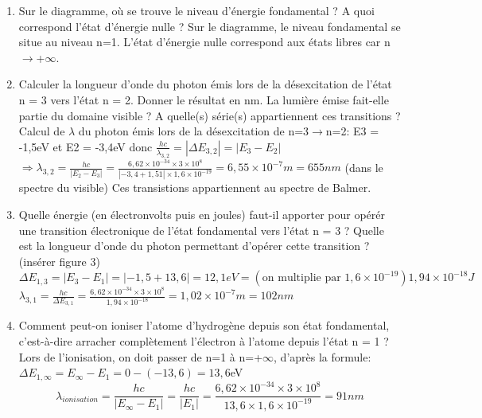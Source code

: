 \documentclass{article}
\begin{document}
\begin{enumerate}
    \item Sur le diagramme, où se trouve le niveau d'énergie fondamental ? A quoi correspond l'état d'énergie nulle ?\newline
    Sur le diagramme, le niveau fondamental se situe au niveau n=1. L'état d'énergie nulle correspond aux états libres car n$\to$+$\infty$.
    \item Calculer la longueur d'onde du photon émis lors de la désexcitation de l'état n = 3 vers l'état n = 2. Donner le résultat en nm. La lumière émise fait-elle partie du domaine visible ? A quelle(s) série(s) appartiennent ces transitions ?\newline\newline
    Calcul de $\lambda$ du photon émis lors de la désexcitation de n=3$\to$n=2:\newline
    E3 = -1,5eV et E2 = -3,4eV donc $\frac{hc}{\lambda_{3,2}} = |\Delta E_{3,2}| = |E_{3}-E_{2}|$\newline
    $\Longrightarrow\lambda_{3,2} = \frac{hc}{|E_{2}-E_{3}|} = \frac{6,62\times 10^{-34}\times 3\times 10^{8}}{|-3,4+1,51|\times 1,6\times 10^{-19}} = 6,55\times 10^{-7}m = 655nm$ (dans le spectre du visible)\newline
    Ces transistions appartiennent au spectre de Balmer.
    \item Quelle énergie (en électronvolts puis en joules) faut-il apporter pour opérér une transition électronique de l'état fondamental vers l'état n = 3 ? Quelle est la longueur d'onde du photon permettant d'opérer cette transition ? (insérer figure 3)\newline
    $\Delta E_{1,3}=|E_{3}-E_{1}|=|-1,5+13,6|= 12,1 eV =(\text{on multiplie par } 1,6\times 10^{-19}) 1,94\times 10^{-18}J$\newline
    $\lambda_{3,1} = \frac{hc}{\Delta E_{3,1}} = \frac{6,62\times 10^{-34}\times 3\times 10^{8}}{1,94\times 10^{-18}} = 1,02\times 10^{-7}m = 102nm$ 
    \item Comment peut-on ioniser l'atome d'hydrogène depuis son état fondamental, c'est-à-dire arracher complètement l'électron à l'atome depuis l'état n = 1 ?\newline
    Lors de l'ionisation, on doit passer de n=1 à n=+$\infty$, d'après la formule: $\Delta E_{1,\infty} = E_{\infty}-E_{1}=0-(-13,6)= 13,6$eV
    \[ \lambda_{ionisation}=\frac{hc}{|E_{\infty}-E_{1}|} = \frac{hc}{|E_{1}|} = \frac{6,62\times 10^{-34}\times 3\times 10^{8}}{13,6\times 1,6\times 10^{-19}} = 91nm \]

\end{enumerate}
\end{document}
